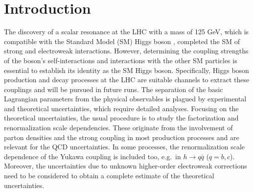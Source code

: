 \section{Introduction}
The discovery of a scalar resonance at the LHC \cite{Aad:2012tfa,Chatrchyan:2012xdj} with a mass of 125 GeV, which is compatible with the
Standard Model (SM) Higgs boson \cite{Higgs:1964ia, Higgs:1964pj,
Englert:1964et, Guralnik:1964eu, Higgs:1966ev, Kibble:1967sv}, completed
the SM of strong and electroweak interactions. However, determining the coupling strengths of the boson's self-interactions and interactions with the other SM particles is essential to establish its identity as the SM Higgs boson. Specifically, Higgs boson production and decay processes at the LHC \cite{Khachatryan:2016vau,ATLAS:2019nkf,CMS:2020xwi} are suitable channels to extract these couplings and will be pursued in future runs. The separation of the basic Lagrangian
parameters from the physical observables is plagued by experimental and
theoretical uncertainties, which require detailed analyses. Focusing on the theoretical uncertainties, the usual procedure is to study the factorization and renormalization scale dependencies. These originate from the involvement of parton densities and the strong coupling in most production processes and are relevant for the QCD uncertainties. In some processes, the renormalization scale dependence of the Yukawa coupling is included too,
e.g.~in $h\to q\bar q$ ($q=b,c$). Moreover, the uncertainties due to unknown higher-order electroweak corrections need to be considered to
obtain a complete estimate of the theoretical uncertainties.

